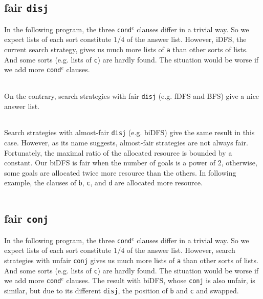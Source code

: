\documentclass[format=acmlarge, review=true, authordraft=true]{acmart}
\newcommand{\conde}{\texttt{cond$^e$} }
\newcommand{\conj}{\texttt{conj}}
\newcommand{\disj}{\texttt{disj}}
\begin{document}
\subsection{fair \texttt{disj}}

In the following program, the three \conde clauses differ in a trivial way. So we expect lists of each sort constitute $1/4$ of the answer list. However, iDFS, the current search strategy, gives us much more lists of \texttt{a} than other sorts of lists. And some sorts (e.g. lists of \texttt{c}) are hardly found. The situation would be worse if we add more \conde clauses.

\begin{center}
	\begin{tabular}{c}
		
	\end{tabular}
\end{center}

On the contrary, search strategies with fair \disj{} (e.g. fDFS and BFS) give a nice answer list.

\begin{center}
	\begin{tabular}{c}
		
	\end{tabular}
\end{center}

Search strategies with almost-fair \disj{} (e.g. biDFS) give the same result in this case. However, as its name suggests, almost-fair strategies are not always fair. Fortunately, the maximal ratio of the allocated resource is bounded by a constant. Our biDFS is fair when the number of goals is a power of 2, otherwise, some goals are allocated twice more resource than the others. In following example, the clauses of \texttt{b}, \texttt{c}, and \texttt{d} are allocated more resource.

\begin{center}
	\begin{tabular}{c}
		
	\end{tabular}
\end{center}

\subsection{fair \texttt{conj}}

In the following program, the three \conde clauses differ in a trivial way. So we expect lists of each sort constitute  $1/4$ of the answer list. However, search strategies with unfair \conj{} gives us much more lists of \texttt{a} than other sorts of lists. And some sorts (e.g. lists of \texttt{c}) are hardly found. The situation would be worse if we add more \conde clauses. The result with biDFS, whose \conj{} is also unfair, is similar, but due to its different \disj{}, the position of \texttt{b} and \texttt{c} and swapped. 
\end{document}
